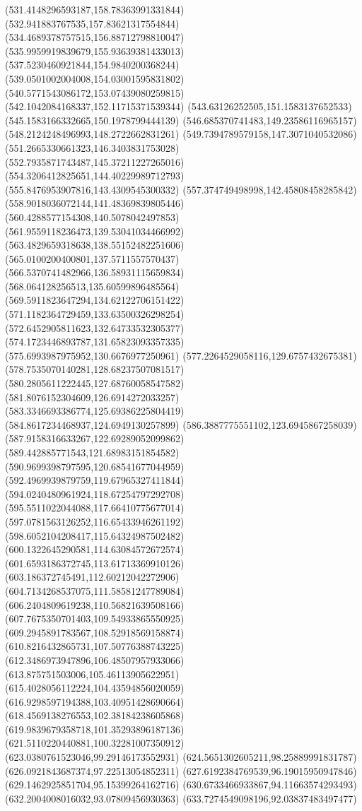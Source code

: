 {(531.4148296593187,158.78363991331844)
(532.941883767535,157.83621317554844)
(534.4689378757515,156.88712798810047)
(535.9959919839679,155.93639381433013)
(537.5230460921844,154.9840200368244)
(539.0501002004008,154.03001595831802)
(540.5771543086172,153.07439080259815)
(542.1042084168337,152.11715371539344)
(543.63126252505,151.1583137652533)
(545.1583166332665,150.1978799444139)
(546.685370741483,149.23586116965157)
(548.2124248496993,148.2722662831261)
(549.7394789579158,147.3071040532086)
(551.2665330661323,146.3403831753028)
(552.7935871743487,145.37211227265016)
(554.3206412825651,144.40229989712793)
(555.8476953907816,143.4309545300332)
(557.374749498998,142.45808458285842)
(558.9018036072144,141.48369839805446)
(560.4288577154308,140.5078042497853)
(561.9559118236473,139.53041034466992)
(563.4829659318638,138.55152482251606)
(565.0100200400801,137.5711557570437)
(566.5370741482966,136.58931115659834)
(568.064128256513,135.60599896485564)
(569.5911823647294,134.62122706151422)
(571.1182364729459,133.63500326298254)
(572.6452905811623,132.64733532305377)
(574.1723446893787,131.65823093357335)
(575.6993987975952,130.6676977250961)
(577.2264529058116,129.6757432675381)
(578.7535070140281,128.68237507081517)
(580.2805611222445,127.68760058547582)
(581.8076152304609,126.6914272033257)
(583.3346693386774,125.69386225804419)
(584.8617234468937,124.6949130257899)
(586.3887775551102,123.6945867258039)
(587.9158316633267,122.69289052099862)
(589.442885771543,121.68983151854582)
(590.9699398797595,120.68541677044959)
(592.4969939879759,119.67965327411844)
(594.0240480961924,118.67254797292708)
(595.5511022044088,117.66410775677014)
(597.0781563126252,116.65433946261192)
(598.6052104208417,115.64324987502482)
(600.1322645290581,114.63084572672574)
(601.6593186372745,113.61713369910126)
(603.186372745491,112.60212042272906)
(604.7134268537075,111.58581247789084)
(606.2404809619238,110.56821639508166)
(607.7675350701403,109.54933865550925)
(609.2945891783567,108.52918569158874)
(610.8216432865731,107.50776388743225)
(612.3486973947896,106.48507957933066)
(613.875751503006,105.46113905622951)
(615.4028056112224,104.43594856020059)
(616.9298597194388,103.40951428690664)
(618.4569138276553,102.38184238605868)
(619.9839679358718,101.35293896187136)
(621.5110220440881,100.32281007350912)
(623.0380761523046,99.29146173552931)
(624.5651302605211,98.25889991831787)
(626.0921843687374,97.22513054852311)
(627.6192384769539,96.19015950947846)
(629.1462925851704,95.15399264162716)
(630.6733466933867,94.11663574293493)
(632.2004008016032,93.07809456930363)
(633.7274549098196,92.03837483497477)
}
